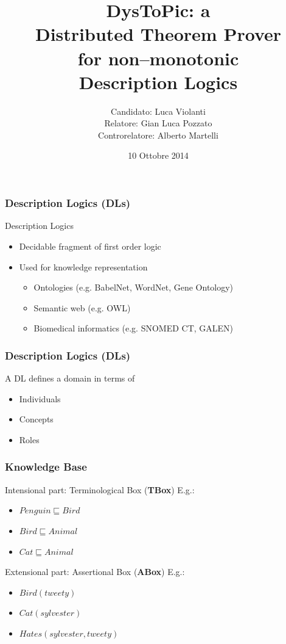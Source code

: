 \documentclass[serif,mathserif]{beamer}
\author[Luca Violanti]{Candidato: Luca Violanti\\Relatore: Gian Luca Pozzato\\Controrelatore: Alberto Martelli}
\title[DysToPic\hspace{2em}\insertframenumber/\inserttotalframenumber]{\textbf{DysToPic}: a \\ Distributed Theorem Prover\\for non--monotonic\\Description Logics}
\date{10 Ottobre 2014} %
\institute{Università degli studi di Torino - Dipartimento di Informatica}
\begin{document}
\maketitle

\begin{frame}
	\frametitle{Description Logics (DLs)}
	
	\begin{block}{Description Logics}
	\begin{itemize}
	\item Decidable fragment of first order logic
  	\item Used for knowledge representation
		\begin{itemize}
			\item Ontologies (e.g. BabelNet, WordNet, Gene Ontology)
			\item Semantic web (e.g. OWL)
			\item Biomedical informatics (e.g. SNOMED CT, GALEN)
		\end{itemize}
	\end{itemize}
	\end{block}
	
\end{frame}

\begin{frame}
  \frametitle{Description Logics (DLs)}
  A DL defines a domain in terms of
  \begin{itemize}
  \item Individuals
  \item Concepts
  \item Roles
  \end{itemize}
\end{frame}

\begin{frame}
	\frametitle{Knowledge Base}
	\begin{block}{Intensional part: Terminological Box (\textbf{TBox})}
	E.g.:
		\begin{itemize}
		\item $Penguin \sqsubseteq Bird$\\
		\item $Bird \sqsubseteq Animal$\\
		\item $Cat \sqsubseteq Animal$\\[0.4cm]
		\end{itemize}
	\end{block}		
	\begin{block}{Extensional part: Assertional Box (\textbf{ABox})}
	E.g.:
		\begin{itemize}
		\item $Bird(tweety)$\\
		\item $Cat(sylvester)$
		\item $Hates(sylvester, tweety)$
		\end{itemize}
	\end{block}
\end{frame}
\end{document}
